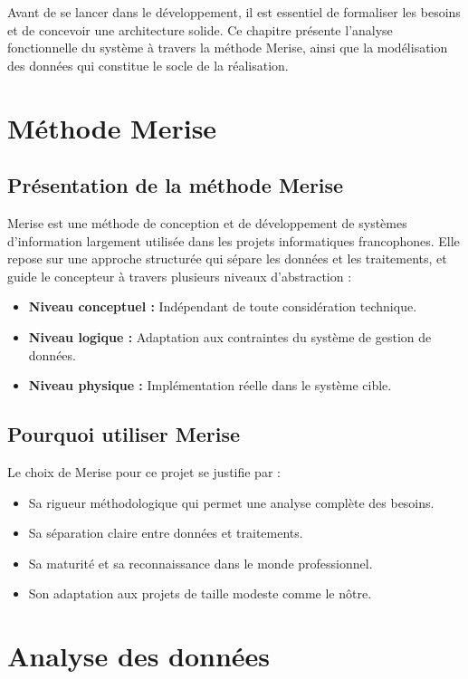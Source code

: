 \documentclass[12pt,a4paper,oneside]{report}
\begin{document}
Avant de se lancer dans le développement, il est essentiel de formaliser les besoins et de concevoir une architecture solide. Ce chapitre présente l'analyse fonctionnelle du système à travers la méthode Merise, ainsi que la modélisation des données qui constitue le socle de la réalisation.

\section{Méthode Merise}

\subsection{Présentation de la méthode Merise}

Merise est une méthode de conception et de développement de systèmes d'information largement utilisée dans les projets informatiques francophones. Elle repose sur une approche structurée qui sépare les données et les traitements, et guide le concepteur à travers plusieurs niveaux d'abstraction :
\begin{itemize}
    \item \textbf{Niveau conceptuel :} Indépendant de toute considération technique.
    \item \textbf{Niveau logique :} Adaptation aux contraintes du système de gestion de données.
    \item \textbf{Niveau physique :} Implémentation réelle dans le système cible.
\end{itemize}

\subsection{Pourquoi utiliser Merise}

Le choix de Merise pour ce projet se justifie par :
\begin{itemize}
    \item Sa rigueur méthodologique qui permet une analyse complète des besoins.
    \item Sa séparation claire entre données et traitements.
    \item Sa maturité et sa reconnaissance dans le monde professionnel.
    \item Son adaptation aux projets de taille modeste comme le nôtre.
\end{itemize}

\section{Analyse des données}
\end{document}
